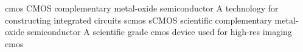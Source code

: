 \newglsXacronym%
{cmos}%
{CMOS}%
{complementary metal{\--}oxide semiconductor}%
{A technology for constructing integrated circuits}%
\newglsXacronym%
{scmos}%
{sCMOS}%
{scientific complementary metal{\--}oxide semiconductor}%
{A scientific grade \gls{cmos} device used for \gls{high-res} imaging}%
{cmos}%